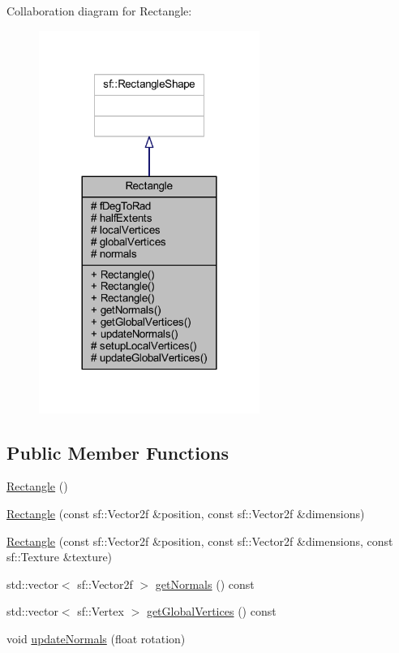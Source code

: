 Collaboration diagram for Rectangle\+:\nopagebreak
\begin{figure}[H]
\begin{center}
\leavevmode
\includegraphics[width=204pt]{class_rectangle__coll__graph}
\end{center}
\end{figure}
\subsection*{Public Member Functions}
\begin{DoxyCompactItemize}
\item 
\hyperlink{class_rectangle_a8a933e0ebd9e80ce91e61ffe87fd577e}{Rectangle} ()
\item 
\hyperlink{class_rectangle_af7d678fca8036bea351850af59a75a35}{Rectangle} (const sf\+::\+Vector2f \&position, const sf\+::\+Vector2f \&dimensions)
\item 
\hyperlink{class_rectangle_af7899b9fa819743228eaacd41b79a77c}{Rectangle} (const sf\+::\+Vector2f \&position, const sf\+::\+Vector2f \&dimensions, const sf\+::\+Texture \&texture)
\item 
std\+::vector$<$ sf\+::\+Vector2f $>$ \hyperlink{class_rectangle_ac1842f29ce2238f53aacb2027d7095b6}{get\+Normals} () const 
\item 
std\+::vector$<$ sf\+::\+Vertex $>$ \hyperlink{class_rectangle_ab8a7c003e34e8dfb8db4aafa2a76ea80}{get\+Global\+Vertices} () const 
\item 
void \hyperlink{class_rectangle_a8e9aa14262388a6dcaa4f7303b0ae9a7}{update\+Normals} (float rotation)
\end{DoxyCompactItemize}
